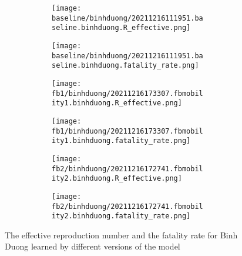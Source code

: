 \begin{figure}[!htb]
    \centering

    \begin{subfigure}[b]{\linewidth}
        \centering
        \begin{subfigure}[b]{0.4\linewidth}
            \texttt{[image: baseline/binhduong/20211216111951.baseline.binhduong.R\_effective.png]}
        \end{subfigure}
        \begin{subfigure}[b]{0.4\linewidth}
            \texttt{[image: baseline/binhduong/20211216111951.baseline.binhduong.fatality\_rate.png]}
        \end{subfigure}
    \end{subfigure}

    \begin{subfigure}[b]{\linewidth}
        \centering
        \begin{subfigure}[b]{0.4\linewidth}
            \texttt{[image: fb1/binhduong/20211216173307.fbmobility1.binhduong.R\_effective.png]}
        \end{subfigure}
        \begin{subfigure}[b]{0.4\linewidth}
            \texttt{[image: fb1/binhduong/20211216173307.fbmobility1.binhduong.fatality\_rate.png]}
        \end{subfigure}
    \end{subfigure}

    \begin{subfigure}[b]{\linewidth}
        \centering
        \begin{subfigure}[b]{0.4\linewidth}
            \texttt{[image: fb2/binhduong/20211216172741.fbmobility2.binhduong.R\_effective.png]}
        \end{subfigure}
        \begin{subfigure}[b]{0.4\linewidth}
            \texttt{[image: fb2/binhduong/20211216172741.fbmobility2.binhduong.fatality\_rate.png]}
        \end{subfigure}
    \end{subfigure}

    \caption{The effective reproduction number and the fatality rate for Binh Duong learned by different versions of the model}
    \label{fig:R0-and-fatality-binhduong}
\end{figure}

